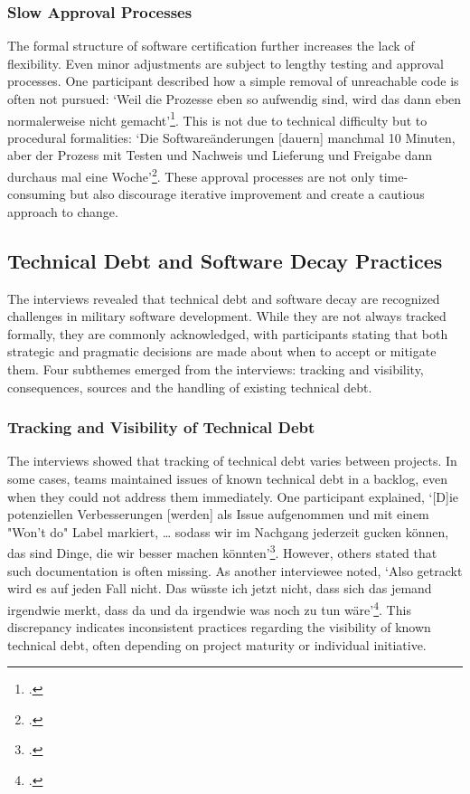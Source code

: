 \subsubsection{Slow Approval Processes}
The formal structure of software certification further increases the lack of flexibility. Even minor adjustments are subject to lengthy testing and approval processes. One participant described how a simple removal of unreachable code is often not pursued:
`Weil die Prozesse eben so aufwendig sind, wird das dann eben normalerweise nicht gemacht'\footcite{Interview22025}. This is not due to technical difficulty but to procedural formalities: `Die Softwareänderungen [dauern] manchmal 10 Minuten, aber der Prozess mit Testen und Nachweis und Lieferung und Freigabe dann durchaus mal eine Woche'\footcite{Interview12025}.
These approval processes are not only time-consuming but also discourage iterative improvement and create a cautious approach to change.

\subsection{Technical Debt and Software Decay Practices}
The interviews revealed that technical debt and software decay are recognized challenges in military software development. While they are not always tracked formally, they are commonly acknowledged, with participants stating that both strategic and pragmatic decisions are made about when to accept or mitigate them.
Four subthemes emerged from the interviews: tracking and visibility, consequences, sources and the handling of existing technical debt.

\subsubsection{Tracking and Visibility of Technical Debt}
The interviews showed that tracking of technical debt varies between projects. In some cases, teams maintained issues of known technical debt in a backlog, even when they could not address them immediately. One participant explained, `[D]ie potenziellen Verbesserungen [werden] als Issue aufgenommen und mit einem "Won't do" Label markiert, \ldots
sodass wir im Nachgang jederzeit gucken können, das sind Dinge, die wir besser machen könnten'\footcite{Interview32025}.
However, others stated that such documentation is often missing. As another interviewee noted, `Also getrackt wird es auf jeden Fall nicht. Das wüsste ich jetzt nicht, dass sich das jemand irgendwie merkt, dass da und da irgendwie was noch zu tun wäre'\footcite{Interview12025}.
This discrepancy indicates inconsistent practices regarding the visibility of known technical debt, often depending on project maturity or individual initiative.\\


